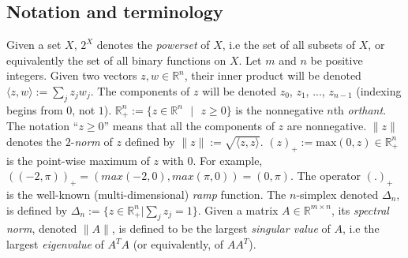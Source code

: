 \documentclass[a4paper,9pt]{extarticle}
\begin{document}
\subsection{Notation and terminology}
Given a set $X$, $2^X$ denotes the \emph{powerset} of $X$, i.e the set
of all subsets of $X$, or equivalently the set of all binary
functions on $X$. Let $m$ and $n$ be positive integers. Given two
vectors $z, w \in \mathbb{R}^n$, their inner product will be denoted
$\langle z, w\rangle := \sum_{j}z_jw_j$. The components of $z$ will be
denoted $z_0$, $z_1$, ..., $z_{n-1}$ (indexing begins from $0$,
not $1$). $\mathbb{R}^{n}_+ := \{z \in \mathbb{R}^{n}\text{ }|\text{ }
z \geq 0\}$ is the nonnegative $n$th \textit{orthant}.
The notation ``$z \ge 0$'' means that all the components of
$z$ are nonnegative.
$\|z\|$ denotes the $2$-\textit{norm} of $z$ defined by $\|z\| :=
\sqrt{\langle z, z\rangle}$. $(z)_+:=\text{max}(0, z) \in
\mathbb{R}^{n}_+$ is the point-wise maximum of $z$ with $0$. For
example, $((-2, \pi))_+ = (max(-2, 0), max(\pi, 0)) = (0, \pi)$. The
operator $(.)_+$ is the well-known (multi-dimensional) \textit{ramp}
function. The $n$-simplex denoted $\Delta_n$, is defined by $\Delta_n
:= \{z \in \mathbb{R}^n_+|\sum_j z_j = 1\}$.
Given a matrix $A \in \mathbb{R}^{m \times n}$, its \textit{spectral
  norm}, denoted $\|A\|$, is
 defined to be the largest \textit{singular value} of $A$, i.e the
 largest \textit{eigenvalue} of $A^TA$ (or equivalently, of $AA^T$).
\end{document}
